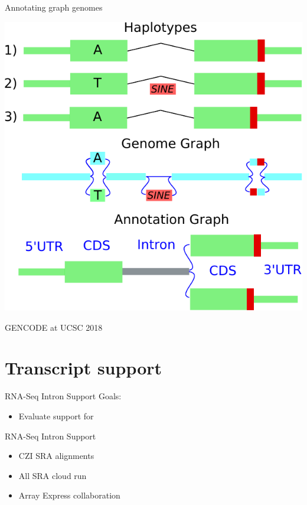 \documentclass[10pt,
               hyperref={bookmarks=false,
                         bookmarksopen=false,
                         colorlinks=true,
                         linkcolor=blue,
                         urlcolor=blue},
               xcolor={svgnames,table}]{beamer}
\newcommand{\sectionframe}[1]{
  \begin{frame}{GENCODE at UCSC 2018}
    \section{#1}
  \end{frame}
}
\begin{document}
\begin{frame}{Annotating graph genomes}
  \begin{center}
    \includegraphics[scale=0.65]{images/graph-annotation.pdf}
  \end{center}
\end{frame}

\sectionframe{Transcript support}
\begin{frame}{RNA-Seq Intron Support}
  Goals:
  
  \begin{itemize}
  \item Evaluate support for 
  \end{itemize}
\end{frame}

\begin{frame}{RNA-Seq Intron Support}
  \begin{itemize}
  \item CZI SRA alignments
  \item All SRA cloud run
  \item Array Express collaboration
  \end{itemize}
\end{frame}
\end{document}
